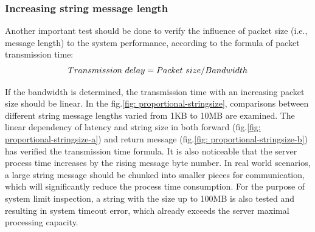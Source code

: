 \subsubsection{Increasing string message length}\label{chap: Result-Internal-string}
Another important test should be done to verify the influence of packet size (i.e., 
message length) to the system performance, according to the formula of packet 
transmission time: 
\begin{equation}
    Transmission $ $ delay = Packet $ $ size/Bandwidth
\end{equation}

If the bandwidth is determined, the transmission time with an increasing packet 
size should be linear. In the fig.\ref{fig: proportional-stringsize}, comparisons 
between different string message lengths varied from 1KB to 10MB are examined. 
The linear dependency of latency and string size in both forward 
(fig.\ref{fig: proportional-stringsize-a}) and return message (fig.\ref{fig: proportional-stringsize-b}) 
has verified the transmission time formula. It is also noticeable that the server 
process time increases by the rising message byte number. In real world scenarios, 
a large string message should be chunked into smaller pieces for communication, 
which will significantly reduce the process time consumption. For the purpose of system limit 
inspection, a string with the size up to 100MB is also tested and resulting in 
system timeout error, which already exceeds the server maximal 
processing capacity. 


